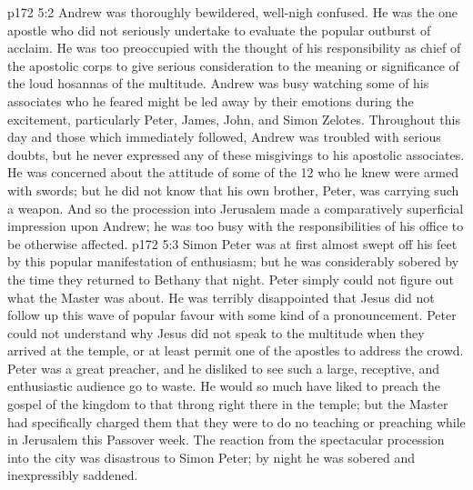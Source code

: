 \vs p172 5:2 Andrew was thoroughly bewildered, well\hyp{}nigh confused. He was the one apostle who did not seriously undertake to evaluate the popular outburst of acclaim. He was too preoccupied with the thought of his responsibility as chief of the apostolic corps to give serious consideration to the meaning or significance of the loud hosannas of the multitude. Andrew was busy watching some of his associates who he feared might be led away by their emotions during the excitement, particularly Peter, James, John, and Simon Zelotes. Throughout this day and those which immediately followed, Andrew was troubled with serious doubts, but he never expressed any of these misgivings to his apostolic associates. He was concerned about the attitude of some of the 12 who he knew were armed with swords; but he did not know that his own brother, Peter, was carrying such a weapon. And so the procession into Jerusalem made a comparatively superficial impression upon Andrew; he was too busy with the responsibilities of his office to be otherwise affected.
\vs p172 5:3 Simon Peter was at first almost swept off his feet by this popular manifestation of enthusiasm; but he was considerably sobered by the time they returned to Bethany that night. Peter simply could not figure out what the Master was about. He was terribly disappointed that Jesus did not follow up this wave of popular favour with some kind of a pronouncement. Peter could not understand why Jesus did not speak to the multitude when they arrived at the temple, or at least permit one of the apostles to address the crowd. Peter was a great preacher, and he disliked to see such a large, receptive, and enthusiastic audience go to waste. He would so much have liked to preach the gospel of the kingdom to that throng right there in the temple; but the Master had specifically charged them that they were to do no teaching or preaching while in Jerusalem this Passover week. The reaction from the spectacular procession into the city was disastrous to Simon Peter; by night he was sobered and inexpressibly saddened.
